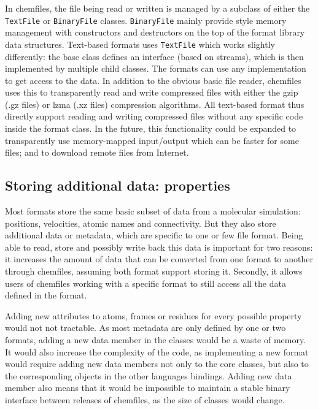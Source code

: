 \documentclass[thesis]{subfiles}
\begin{document}
In chemfiles, the file being read or written is managed by a subclass of either
the \texttt{TextFile} or \texttt{BinaryFile} classes. \texttt{BinaryFile} mainly
provide \cxx style memory management with constructors and destructors on the
top of the format library data structures. Text-based formats uses
\texttt{TextFile} which works slightly differently: the base class defines an
interface (based on \cxx streams), which is then implemented by multiple child
classes. The formats can use any implementation to get access to the data. In
addition to the obvious basic file reader, chemfiles uses this to transparently
read and write compressed files with either the gzip (.gz files) or lzma (.xz
files) compression algorithms. All text-based format thus directly support
reading and writing compressed files without any specific code inside the format
class. In the future, this functionality could be expanded to transparently use
memory-mapped input/output which can be faster for some files; and to download
remote files from Internet.

\subsection{Storing additional data: properties}

Most formats store the same basic subset of data from a molecular simulation:
positions, velocities, atomic names and connectivity. But they also store
additional data or metadata, which are specific to one or few file format. Being
able to read, store and possibly write back this data is important for two
reasons: it increases the amount of data that can be converted from one format
to another through chemfiles, assuming both format support storing it. Secondly,
it allows users of chemfiles working with a specific format to still access all
the data defined in the format.

Adding new attributes to atoms, frames or residues for every possible property
would not not tractable. As most metadata are only defined by one or two
formats, adding a new data member in the classes would be a waste of memory. It
would also increase the complexity of the code, as implementing a new format
would require adding new data members not only to the core \cxx classes, but
also to the corresponding objects in the other languages bindings. Adding new
data member also means that it would be impossible to maintain a stable binary
interface between releases of chemfiles, as the size of classes would change.
\end{document}
